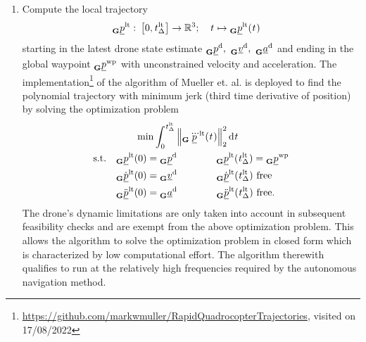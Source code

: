 \begin{enumerate}
    \item Compute the local trajectory 
    \begin{align} \label{eq:loc_traj}
        \pos[]{\loctraj}{}{\grs}{}
        :\ 
        &\left[0, \dur[]{\loctraj}{}{}{}\right] \rightarrow \mathbb{R}^3
        ;\quad
        \timepnt[]{}{}{}{}
        \mapsto
        \pos[]{\loctraj}{}{\grs}{}(\timepnt[]{}{}{}{})
    \end{align}
    starting in the latest drone state estimate
    $\pos[]{\drone}{}{\grs}{}
    ,\ 
    \vel[]{\drone}{}{\grs}{}
    ,\ 
    \acc[]{\drone}{}{\grs}{}$
    and ending in the global waypoint
    $\pos[]{\wayp}{}{\grs}{}$
    with unconstrained velocity and acceleration.
    The implementation\footnote{
            \url{https://github.com/markwmuller/RapidQuadrocopterTrajectories}, visited on 17/08/2022
    } 
    of the algorithm of Mueller et. al. \cite{Mueller2013}
    is deployed to find the polynomial trajectory with minimum jerk
    (third time derivative of position)
    by solving the optimization problem
    \begin{align} \label{eq:loc_traj_opt_prob}
        &\qquad \min 
        \int_0^{\dur[]{\loctraj}{}{}{}}
            \left\|
                \pos[\dddot]{\loctraj}{}{\grs}{}(\timepnt[]{}{}{}{})
            \right\|^2_2
        \text d \timepnt[]{}{}{}{}
        \nonumber \\
        \text{s.t.}\quad
        & \pos[]{\loctraj}{}{\grs}{}(0) = \pos[]{\drone}{}{\grs}{}
        \qquad\qquad \pos[]{\loctraj}{}{\grs}{}(\dur[]{\loctraj}{}{}{}) = \pos[]{\wayp}{}{\grs}{}
        \nonumber \\
        & \pos[\dot]{\loctraj}{}{\grs}{}(0) = \vel[]{\drone}{}{\grs}{}
        \qquad\qquad \pos[\dot]{\loctraj}{}{\grs}{}(\dur[]{\loctraj}{}{}{}) \text{ free}
        \nonumber \\
        & \pos[\ddot]{\loctraj}{}{\grs}{}(0) = \acc[]{\drone}{}{\grs}{}
        \qquad\qquad \pos[\ddot]{\loctraj}{}{\grs}{}(\dur[]{\loctraj}{}{}{}) \text{ free}.
    \end{align}
    The drone's dynamic limitations
    are only taken into account in subsequent feasibility checks 
    and are exempt from the above optimization problem.
    This allows the algorithm to solve the optimization problem in closed form
    which is characterized by low computational effort.
    The algorithm therewith qualifies 
    to run at the relatively high frequencies
    required by the autonomous navigation method.
\end{enumerate}


